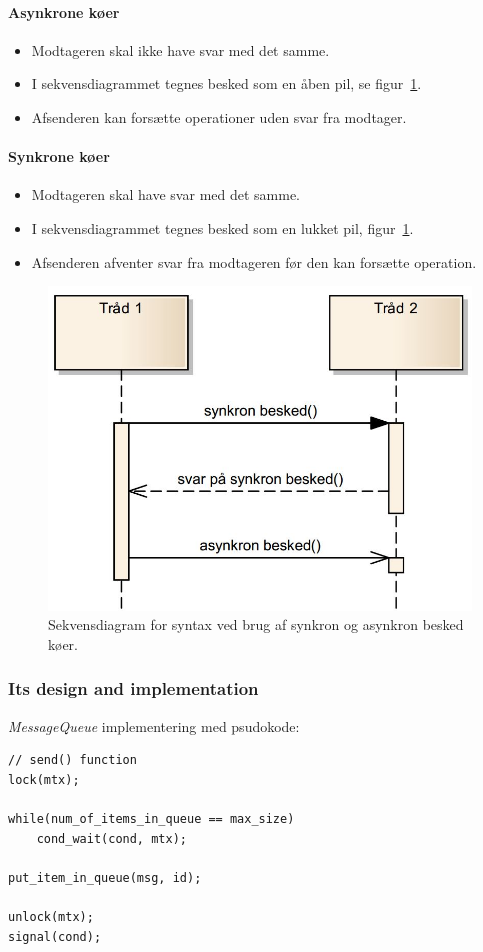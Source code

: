 \paragraph{Asynkrone køer}
\begin{itemize}
	\item Modtageren skal ikke have svar med det samme.
	\item I sekvensdiagrammet tegnes besked som en åben pil, se figur~\ref{fig:msq_seqdia}.
	\item Afsenderen kan forsætte operationer uden svar fra modtager.
\end{itemize}

\paragraph{Synkrone køer}
\begin{itemize}
	\item Modtageren skal have svar med det samme.
	\item I sekvensdiagrammet tegnes besked som en lukket pil, figur~\ref{fig:msq_seqdia}.
	\item Afsenderen afventer svar fra modtageren før den kan forsætte operation.
\end{itemize}

\begin{figure}[h]
	\centering
	\includegraphics[width=0.6\linewidth]{figs/spm3/msq_seqdia}
	\caption[Syntax for sekvensdiagram med syn -og asynkron msq.]{Sekvensdiagram for syntax ved brug af synkron og asynkron besked køer.}
	\label{fig:msq_seqdia}
\end{figure}

\subsubsection{Its design and implementation}
\textit{MessageQueue} implementering med psudokode:
\begin{lstlisting}[morekeywords={unlock, lock, signal, cond_wait}]
// send() function
lock(mtx);

while(num_of_items_in_queue == max_size)
	cond_wait(cond, mtx);

put_item_in_queue(msg, id);

unlock(mtx);
signal(cond);
\end{lstlisting}

